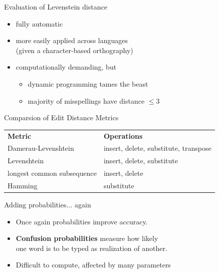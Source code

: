 \documentclass[professionalfonts, xcolor={usenames,svgnames,x11names,table}]{beamer}
\begin{document}
\begin{frame}{Evaluation of Levenstein distance}
    \begin{itemize}
        \item fully automatic
        \item more easily applied across languages\\
              (given a character-based orthography)
        \item computationally demanding, but
            \begin{itemize}
                \item dynamic programming tames the beast
                \item majority of misspellings have distance $\leq 3$
            \end{itemize}
    \end{itemize}

    \pause
    \begin{block}{Comparsion of Edit Distance Metrics}
        \centering
        \begin{tabular}{ll}
            \textbf{Metric} & \textbf{Operations}\\
            Damerau-Levenshtein & insert, delete, substitute, transpose\\
            Levenshtein & insert, delete, substitute\\
            longest common subsequence & insert, delete\\
            Hamming & substitute
        \end{tabular}
    \end{block}
\end{frame}

\begin{frame}{Adding probabilities$\ldots$ again}
    \begin{itemize}
        \item Once again probabilities improve accuracy.
        \item \textbf{Confusion probabilities} measure how likely\\
            one word is to be typed as realization of another.
        \item Difficult to compute, affected by many parameters\\
    \end{itemize}
\end{frame}
\end{document}
